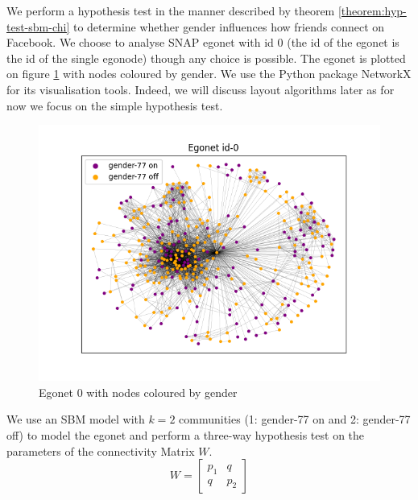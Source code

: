 \documentclass[]{article}
\newcommand{\figwidth}{\linewidth}
\begin{document}
\begin{multicols*}{2}
We perform a hypothesis test in the manner described by theorem \ref{theorem:hyp-test-sbm-chi} to determine whether gender influences how friends connect on Facebook. We choose to analyse SNAP egonet with id 0 (the id of the egonet is the id of the single egonode) though any choice is possible. The egonet is plotted on figure \ref{fig:ego-0-by-gender} with nodes coloured by gender. We use the Python package NetworkX \cite{networkx} for its visualisation tools. Indeed, we will discuss layout algorithms later as for now we focus on the simple hypothesis test.
%
\begin{figure}[H]
	\centering
	\includegraphics[width=\figwidth]{ego-0-by-gender.png}
	\caption{Egonet 0 with nodes coloured by gender}
	\label{fig:ego-0-by-gender}
\end{figure}

We use an SBM model with $k=2$ communities (1: gender-77 on and 2: gender-77 off) to model the egonet and perform a three-way hypothesis test on the parameters of the connectivity Matrix $W$.
%
\begin{equation}
	W = \begin{bmatrix}
		p_1 & q \\
		q & p_2
	\end{bmatrix}
\end{equation}


\end{multicols*}
\end{document}
